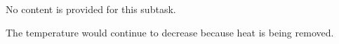 No content is provided for this subtask.

The temperature would continue to decrease because heat is being removed.